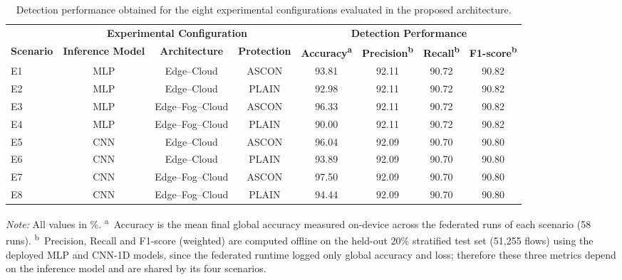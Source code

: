 \documentclass[journal,article,submit,moreauthors]{Definitions/mdpi}
\begin{document}
\begin{table}[ht]
\centering
\caption{Detection performance obtained for the eight experimental configurations evaluated in the proposed architecture.}
\label{tab:detection_capability}
\footnotesize
\begin{tabular}{lccccccc}
\toprule
&
\multicolumn{3}{c}{\textbf{Experimental Configuration}}
&
\multicolumn{4}{c}{\textbf{Detection Performance}}
\\
\cmidrule(lr){2-4}
\cmidrule(lr){5-8}
\textbf{Scenario} & \textbf{Inference Model} &  \textbf{Architecture} & \textbf{Protection} & \textbf{Accuracy\textsuperscript{a}} & \textbf{Precision\textsuperscript{b}} & \textbf{Recall\textsuperscript{b}} & \textbf{F1-score\textsuperscript{b}}
\\
\midrule
E1 & MLP & Edge--Cloud      & ASCON & 93.81 & 92.11 & 90.72 & 90.82 \\
E2 & MLP & Edge--Cloud      & PLAIN & 92.98 & 92.11 & 90.72 & 90.82 \\
E3 & MLP & Edge--Fog--Cloud & ASCON & 96.33 & 92.11 & 90.72 & 90.82 \\
E4 & MLP & Edge--Fog--Cloud & PLAIN & 90.00 & 92.11 & 90.72 & 90.82 \\
E5 & CNN & Edge--Cloud      & ASCON & 96.04 & 92.09 & 90.70 & 90.80 \\
E6 & CNN & Edge--Cloud      & PLAIN & 93.89 & 92.09 & 90.70 & 90.80 \\
E7 & CNN & Edge--Fog--Cloud & ASCON & 97.50 & 92.09 & 90.70 & 90.80 \\
E8 & CNN & Edge--Fog--Cloud & PLAIN & 94.44 & 92.09 & 90.70 & 90.80 \\
\bottomrule
\end{tabular}
\vspace{2mm}
\begin{flushleft}
\footnotesize\textit{Note:} All values in \%. \textsuperscript{a}~Accuracy is the mean final global accuracy measured on-device across the federated runs of each scenario (58 runs). \textsuperscript{b}~Precision, Recall and F1-score (weighted) are computed offline on the held-out 20\% stratified test set (51{,}255 flows) using the deployed MLP and CNN-1D models, since the federated runtime logged only global accuracy and loss; therefore these three metrics depend on the inference model and are shared by its four scenarios.
\end{flushleft}
\end{table}
\end{document}
